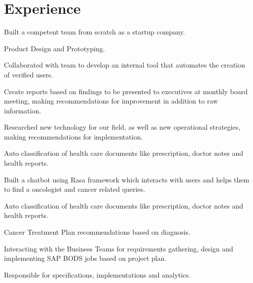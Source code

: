 \documentclass[letterpaper]{deedy-resume} %
\begin{document}
\begin{minipage}[t]{0.66\textwidth} %


\section{Experience}


\vspace{\topsep} %
\begin{tightitemize}
\item {Built a competent team from scratch as a startup company.}
\item {Product Design and Prototyping.}
\item {Collaborated with team to develop an internal tool that automates the creation of verified users.}
\item {Create reports based on findings to be presented to executives at monthly board meeting, making recommendations for improvement
in addition to raw information.}
\item {Researched new technology for our field, as well as new operational strategies, making recommendations for implementation.}
\item {Auto classification of health care documents like prescription, doctor notes and health reports.}
\item {Built a chatbot using Rasa framework which interacts with users and helps them to find a oncologist and cancer related queries.}
\item {Auto classification of health care documents like prescription, doctor notes and health reports.}
\item {Cancer Treatment Plan recommendations based on diagnosis.}


\end{tightitemize}

\sectionspace %


\begin{tightitemize}
\item {Interacting with the Business Teams for requirements gathering, design and implementing SAP BODS jobs based on project plan.}
\item {Responsible for specifications, implementations and analytics.}


\end{tightitemize}
\end{minipage}
\end{document}
